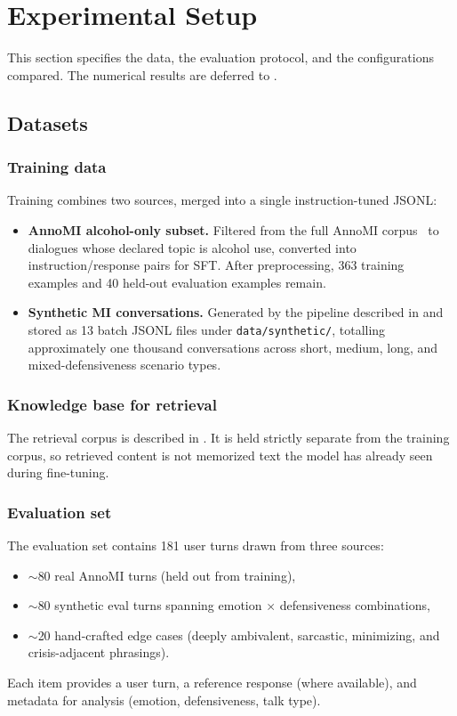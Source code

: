 \section{Experimental Setup}
\label{sec:experiments}

This section specifies the data, the evaluation protocol, and the
configurations compared. The numerical results are deferred to
.

\subsection{Datasets}

\subsubsection*{Training data}
Training combines two sources, merged into a single instruction-tuned JSONL:
\begin{itemize}
    \item \textbf{AnnoMI alcohol-only subset.} Filtered from the full AnnoMI
    corpus~\cite{wu2022annomi} to dialogues whose declared topic is alcohol use,
    converted into instruction/response pairs for SFT. After preprocessing,
    363 training examples and 40 held-out evaluation examples remain.
    \item \textbf{Synthetic MI conversations.} Generated by the pipeline
    described in  and stored as 13 batch JSONL files under
    \texttt{data/synthetic/}, totalling approximately one thousand
    conversations across short, medium, long, and mixed-defensiveness
    scenario types.
\end{itemize}

\subsubsection*{Knowledge base for retrieval}
The retrieval corpus is described in . It is held strictly
separate from the training corpus, so retrieved content is not memorized text
the model has already seen during fine-tuning.

\subsubsection*{Evaluation set}
The evaluation set contains 181 user turns drawn from three sources:
\begin{itemize}
    \item $\sim$80 real AnnoMI turns (held out from training),
    \item $\sim$80 synthetic eval turns spanning emotion $\times$ defensiveness
    combinations,
    \item $\sim$20 hand-crafted edge cases (deeply ambivalent, sarcastic,
    minimizing, and crisis-adjacent phrasings).
\end{itemize}
Each item provides a user turn, a reference response (where available), and
metadata for analysis (emotion, defensiveness, talk type).

